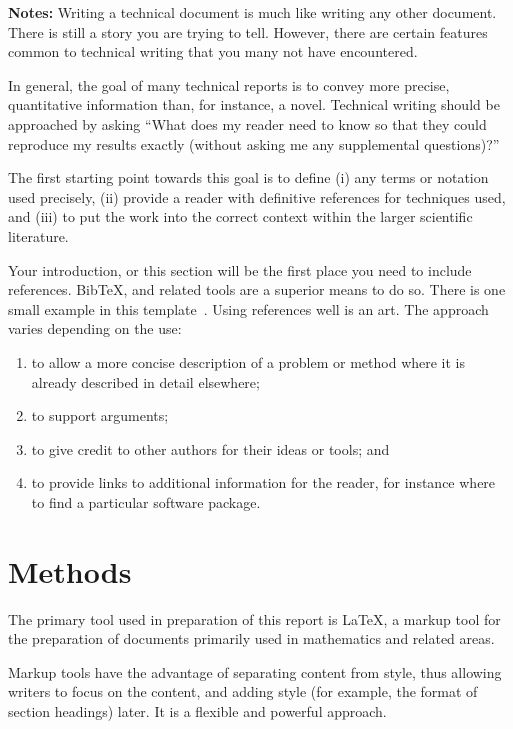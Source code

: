 \documentclass[12pt,a4paper]{article}
\begin{document}
{\bf Notes:}
Writing a technical document is much like writing any other
document. There is still a story you are trying to tell. However,
there are certain features common to technical writing that you many
not have encountered.

In general, the goal of many technical reports is to convey more
precise, quantitative information than, for instance, a
novel. Technical writing should be approached by asking ``What does my
reader need to know so that they could reproduce my results exactly
(without asking me any supplemental questions)?'' 

The first starting point towards this goal is to define (i) any terms
or notation used precisely, (ii) provide a reader with definitive
references for techniques used, and (iii) to put the work into the
correct context within the larger scientific literature. 

Your introduction, or this section will be the first place you need to
include references.  BibTeX, and related tools are a superior means to
do so. There is one small example in this
template~\cite{guy17:_thing_i_wrote}.  Using references well is an
art. The approach varies depending on the use:
\begin{enumerate}

\item to allow a more concise description of a problem or method where
  it is already described in detail elsewhere;

\item to support arguments;

\item to give credit to other authors for their ideas or tools; and 

\item to provide links to additional information for the reader, for
  instance where to find a particular software package.

\end{enumerate}


\clearpage
\section{Methods}

The primary tool used in preparation of this report is \LaTeX , a
markup tool for the preparation of documents primarily used in
mathematics and related areas. 

Markup tools have the advantage of separating content from style, thus
allowing writers to focus on the content, and adding style (for
example, the format of section headings) later. It is a flexible and
powerful approach. 
\end{document}
